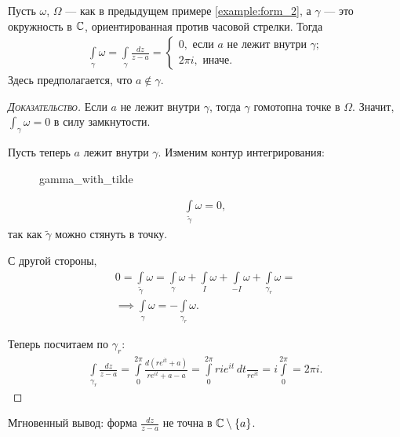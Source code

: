 \documentclass[../../main.tex]{subfiles}
\begin{document}
\begin{exmpl}
 Пусть $\omega$, $\Omega$ --- как в предыдущем примере \ref{example:form_2}, а $\gamma$ --- это окружность в $\mathbb{C}$, ориентированная против часовой стрелки. Тогда
 \begin{align*}
  \int\limits_{\gamma} \omega = \int\limits_{\gamma} \frac{dz}{z-a} = \begin{cases}
   0, \text{ если $a$ не лежит внутри $\gamma$;}  \\
   2\pi i, \text{ иначе. }
  \end{cases} 
 \end{align*} Здесь предполагается, что $a \notin \gamma$.
\end{exmpl}
\begin{proof}[\normalfont\textsc{Доказательство}]
 Если $a$ не лежит внутри $\gamma$, тогда $\gamma$ гомотопна точке в $\Omega$. Значит, $\int_{\gamma} \omega = 0 $  в силу замкнутости.

Пусть теперь $a$  лежит внутри $\gamma$. Изменим контур интегрирования:

\begin{figure}[ht]
    \centering
    \caption{gamma_with_tilde}
    \label{fig:gamma_with_tilde}
\end{figure}

\begin{align*}
 \int\limits_{\tilde\gamma}  \omega = 0,
\end{align*} так как $\tilde\gamma$ можно стянуть в точку.

С другой стороны,
 \begin{align*}
 0 = \int\limits_{\tilde\gamma}  \omega = \int\limits_{\gamma}  \omega + \int\limits_{I}  \omega + \int\limits_{-I}   \omega + \int\limits_{\gamma_r}  \omega = \\
 \implies \int\limits_{\gamma} \omega = -\int\limits_{\gamma_r}   \omega.
\end{align*}

Теперь посчитаем по $\gamma_r$:
 \begin{align*}
 \int\limits_{\gamma_r} \frac{dz}{z - a}  = \int\limits_{0}^{2\pi}   \frac{d(re^{it} + a)}{r e^{it} + a - a} = \int\limits_{0}^{2\pi} r i e^{it}\,dt \frac{}{r e^{it}} = i \int\limits_{0}^{2\pi} = 2\pi i.
\end{align*} 

\end{proof}

Мгновенный вывод: форма $\frac{dz}{z - a}$ не точна в $\mathbb{C} \setminus \left\{ a \right\}$.
\end{document}
